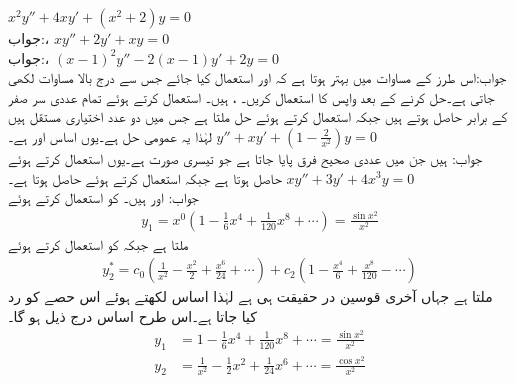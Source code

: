 \quad
$x^2y''+4xy'+(x^2+2)y=0$\\
جواب:، 
\quad
$xy''+2y'+xy=0$\\
جواب:، 
\quad 
$(x-1)^2y''-2(x-1)y'+2y=0$\\
جواب:اس طرز کے مساوات میں بہتر ہوتا ہے کہ  اور  استعمال کیا جائے جس سے درج بالا مساوات  لکھی جاتی ہے۔حل کرنے کے بعد واپس  کا استعمال کریں۔ 
،  ہیں۔ استعمال کرتے ہوئے تمام عددی سر صفر کے برابر حاصل ہوتے ہیں جبکہ  استعمال کرتے ہوئے حل  ملتا ہے جس میں دو عدد اختیاری مستقل ہیں لہٰذا یہ عمومی حل ہے۔یوں اساس  اور  ہے۔
\quad
$y''+xy'+(1-\frac{2}{x^2})y=0$\\
جواب:  ہیں جن میں عددی صحیح فرق پایا جاتا ہے جو تیسری صورت ہے۔یوں  استعمال کرتے ہوئے    حاصل ہوتا ہے جبکہ  استعمال کرتے ہوئے  حاصل ہوتا ہے۔
\quad
$xy''+3y'+4x^3y=0$\\
جواب: اور  ہیں۔  کو استعمال کرتے ہوئے
\begin{align*}
y_1=x^{0}(1-\tfrac{1}{6}x^4+\tfrac{1}{120}x^8+\cdots)=\tfrac{\sin x^2}{x^2}
\end{align*}
ملتا ہے جبکہ  کو استعمال کرتے ہوئے
\begin{align*}
y^*_2=c_0(\frac{1}{x^2}-\frac{x^2}{2}+\frac{x^6}{24}+\cdots)+c_2(1-\frac{x^4}{6}+\frac{x^8}{120}-\cdots)
\end{align*}
ملتا ہے جہاں آخری قوسین در حقیقت  ہی ہے لہٰذا اساس لکھتے ہوئے اس حصے کو رد کیا جاتا ہے۔اس طرح اساس درج ذیل ہو گا۔
\begin{align*}
y_1&=1-\tfrac{1}{6}x^4+\tfrac{1}{120}x^8+\cdots=\tfrac{\sin x^2}{x^2}\\
y_2&=\frac{1}{x^2}-\tfrac{1}{2}x^2+\tfrac{1}{24}x^6+\cdots=\tfrac{\cos x^2}{x^2}
\end{align*}
